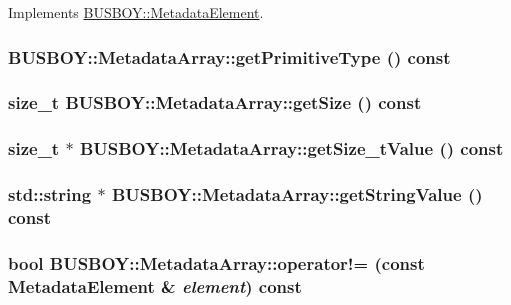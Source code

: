 Implements \hyperlink{classBUSBOY_1_1MetadataElement_a048a64f1d70affc5bfdd78a9958c5fb9}{BUSBOY::MetadataElement}.\hypertarget{classBUSBOY_1_1MetadataArray_ad3d9b5a9ad0f22ff32b31db7213117de}{
\subsubsection[{getPrimitiveType}]{ BUSBOY::MetadataArray::getPrimitiveType () const}}
\label{classBUSBOY_1_1MetadataArray_ad3d9b5a9ad0f22ff32b31db7213117de}
\hypertarget{classBUSBOY_1_1MetadataArray_a41adb6cde8e1adf9a85813dfac0611d4}{
\subsubsection[{getSize}]{\setlength{\rightskip}{0pt plus 5cm}size\_\-t BUSBOY::MetadataArray::getSize () const}}
\label{classBUSBOY_1_1MetadataArray_a41adb6cde8e1adf9a85813dfac0611d4}
\hypertarget{classBUSBOY_1_1MetadataArray_a6a0594d8b1cda2669e312e22bc0d3c99}{
\subsubsection[{getSize\_\-tValue}]{\setlength{\rightskip}{0pt plus 5cm}size\_\-t $\ast$ BUSBOY::MetadataArray::getSize\_\-tValue () const}}
\label{classBUSBOY_1_1MetadataArray_a6a0594d8b1cda2669e312e22bc0d3c99}
\hypertarget{classBUSBOY_1_1MetadataArray_a2ec7ef059e89030606d9090af71d7a11}{
\subsubsection[{getStringValue}]{\setlength{\rightskip}{0pt plus 5cm}std::string $\ast$ BUSBOY::MetadataArray::getStringValue () const}}
\label{classBUSBOY_1_1MetadataArray_a2ec7ef059e89030606d9090af71d7a11}
\hypertarget{classBUSBOY_1_1MetadataArray_a781093b168f59ed77d378ead7cb3cc37}{
\subsubsection[{operator!=}]{\setlength{\rightskip}{0pt plus 5cm}bool BUSBOY::MetadataArray::operator!= (const {\bf MetadataElement} \& {\em element}) const}}
